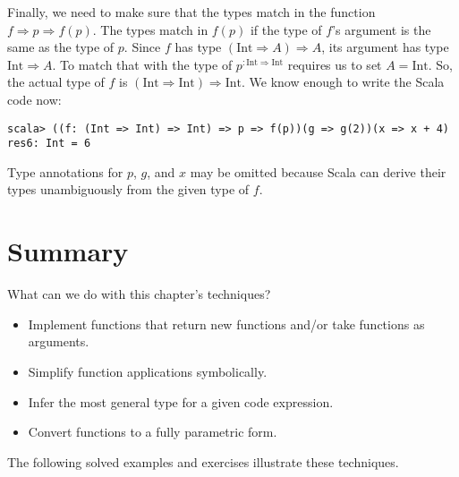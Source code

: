 Finally, we need to make sure that the types match in the function
$f\Rightarrow p\Rightarrow f(p)$. The types match in $f(p)$ if the
type of $f$'s argument is the same as the type of $p$. Since $f$
has type $\left(\text{Int}\Rightarrow A\right)\Rightarrow A$, its
argument has type $\text{Int}\Rightarrow A$. To match that with the
type of $p^{:\text{Int}\Rightarrow\text{Int}}$ requires us to set
$A=\text{Int}$. So, the actual type of $f$ is $\left(\text{Int}\Rightarrow\text{Int}\right)\Rightarrow\text{Int}$.
We know enough to write the Scala code now:
\begin{lstlisting}
scala> ((f: (Int => Int) => Int) => p => f(p))(g => g(2))(x => x + 4)
res6: Int = 6
\end{lstlisting}
Type annotations for $p$, $g$, and $x$ may be omitted because Scala
can derive their types unambiguously from the given type of $f$.

\section{Summary}

What can we do with this chapter's techniques?
\begin{itemize}
\item Implement functions that return new functions and/or take functions
as arguments.
\item Simplify function applications symbolically.
\item Infer the most general type for a given code expression.
\item Convert functions to a fully parametric form.
\end{itemize}
The following solved examples and exercises illustrate these techniques.

